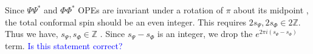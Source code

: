 \documentclass[11pt]{article}
\newcommand{\p}{\partial}
\newcommand{\mO}{\mathcal{O}}
\newcommand{\nn}{\nonumber}
\newcommand{\lb}{\left(}
\newcommand{\rb}{\right)}
\newcommand{\NL}[1]{\textcolor{blue}{#1}}
\newcommand{\JM}[1]{\textcolor{orange}{#1}}
\begin{document}
Since $\Psi \Psi^*$ and $\Phi \Phi^*$ OPEs are invariant under a rotation of $\pi$ about its midpoint \cite{calabrese2011entanglement}, the total conformal spin should be an even integer. This requires $2s_\Psi, 2s_\Phi \in 2\mathbb{Z}$. Thus we have, $s_\Psi, s_\Phi \in \mathbb{Z}$ \cite{calabrese2011entanglement}. 
Since 
$s_\Psi-s_\Phi$
is an integer, we drop the 
$e^{2\pi i (s_\Psi-s_\Phi)}$ 
term. \NL{Is this statement correct?}


\end{document}
